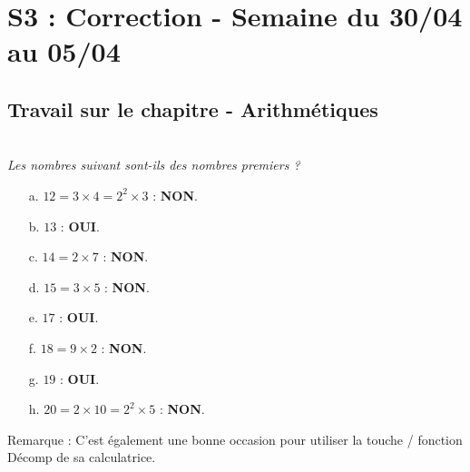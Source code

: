 \documentclass[11pt]{article}
\begin{document}

\newtheorem{Definition}{Définition}
\newtheorem{Theorem}{Théorème}
\newtheorem{Proposition}{Propriété}
\newtheorem{Exo}{Éxercice}

\renewcommand{\labelitemi}{$\bullet$}
\renewcommand{\labelitemii}{$\circ$}

\setlength{\columnseprule}{1pt}

\section*{S3 : Correction - Semaine du 30/04 au 05/04}

\subsection*{Travail sur le chapitre - Arithmétiques}

\\
\textit{Les nombres suivant sont-ils des nombres premiers ?}
\begin{multicols}{3}
\begin{enumerate}
    \item[a.] $12 = 3 \times 4 = 2^2 \times 3$ : \textbf{NON}.
    \item[b.] $13$ : \textbf{OUI}. 
    \item[c.] $14 = 2 \times 7$ : \textbf{NON}.
    \item[d.] $15 = 3 \times 5$ : \textbf{NON}.
    \item[e.] $17$ : \textbf{OUI}.
    \item[f.] $18 = 9 \times 2$ : \textbf{NON}.
    \item[g.] $19$ : \textbf{OUI}.
    \item[h.] $20 = 2 \times 10 = 2^2 \times 5$ : \textbf{NON}.
\end{enumerate}
\end{multicols}
Remarque : C'est également une bonne occasion pour utiliser la touche / fonction Décomp de sa calculatrice. 
\end{document}
